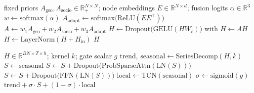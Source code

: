 
\begin{algorithm}[t]
\caption{Heterogeneous adaptive graph fusion (one forward pass of the graph block)}
\label{alg:graph}
\begin{algorithmic}[1]
\Require fixed priors $A_{\mathrm{geo}}, A_{\mathrm{socio}}\in\mathbb{R}_+^{N\times N}$;
node embeddings $E\in\mathbb{R}^{N\times d}$; fusion logits $\alpha\in\mathbb{R}^{3}$
\State $w\gets\mathrm{softmax}(\alpha)$                                
\State $A_{\mathrm{adapt}}\gets\mathrm{softmax}\!\big(\mathrm{ReLU}(E E^{\top})\big)$ 
\State $A\gets w_1 A_{\mathrm{geo}}+w_2 A_{\mathrm{socio}}+w_3 A_{\mathrm{adapt}}$
                                              
  \State $H\gets\mathrm{Dropout}\!\big(\mathrm{GELU}(H W_\ell)\big)$ with $H\gets A H$
  \State $H\gets\mathrm{LayerNorm}(H + H_{\mathrm{in}})$              
\EndFor
\State \Return $H$                                                    \Comment{$[B,T,N,h]$}
\end{algorithmic}
\end{algorithm}

\begin{algorithm}[t]
\caption{Multi-scale temporal block with series decomposition and gated fusion}
\label{alg:temporal}
\begin{algorithmic}[1]
\Require $H\in\mathbb{R}^{B N\times T\times h}$; kernel $k$; gate scalar $g$
\State $\mathrm{trend},\ \mathrm{seasonal}\gets\mathrm{SeriesDecomp}(H,k)$ 
\State $S\gets\mathrm{seasonal}$
                                                
  \State $S\gets S+\mathrm{Dropout}\big(\mathrm{ProbSparseAttn}(\mathrm{LN}(S))\big)$
  \State $S\gets S+\mathrm{Dropout}\big(\mathrm{FFN}(\mathrm{LN}(S))\big)$
\EndFor
\State $\mathrm{local}\gets\mathrm{TCN}(\mathrm{seasonal})$            
\State $\sigma\gets\mathrm{sigmoid}(g)$
\State \Return $\mathrm{trend}+\sigma\cdot S+(1-\sigma)\cdot\mathrm{local}$
\end{algorithmic}
\end{algorithm}

